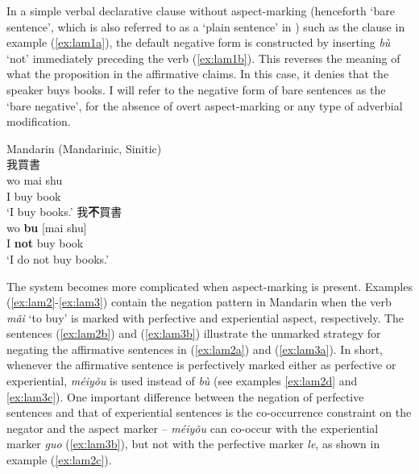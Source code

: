 \documentclass[output=paper]{langscibook}
\begin{document}
In a simple verbal declarative clause without aspect-marking (henceforth `bare sentence', which is also referred to as a `plain sentence' in \citealt{Wang1965}) such as the clause in example (\ref{ex:lam1a}), the default negative form is constructed by inserting \textit{bù} `not' immediately preceding the verb (\ref{ex:lam1b}). This reverses the meaning of what the proposition in the affirmative claims. In this case, it denies that the speaker buys books. I will refer to the negative form of bare sentences as the `bare negative', for the absence of overt aspect-marking or any type of adverbial modification.



\ea Mandarin (Mandarinic, Sinitic) \label{ex:lam1}\\ 
  \ea 我買書 \label{ex:lam1a}\\
    \gll wo mai	shu \\
         I	buy	book\\
    \glt `I buy books.'
  \ex 我\textbf{不}買書 \label{ex:lam1b}\\
    \gll wo \textbf{bu} [mai shu]\\
    	I \textbf{not} buy book\\
    \glt `I do not buy books.'
\z \z

The system becomes more complicated when aspect-marking is present. Examples (\ref{ex:lam2}-\ref{ex:lam3}) contain the negation pattern in Mandarin when the verb \textit{mǎi} `to buy' is marked with perfective and experiential aspect, respectively. The sentences (\ref{ex:lam2b}) and (\ref{ex:lam3b}) illustrate the unmarked strategy for negating the affirmative sentences in (\ref{ex:lam2a}) and (\ref{ex:lam3a}). In short, whenever the affirmative sentence is perfectively marked either as perfective or experiential, \textit{méiyǒu} is used instead of \textit{bù} (see examples \ref{ex:lam2d} and \ref{ex:lam3c}). One important difference between the negation of perfective sentences and that of experiential sentences is the co-occurrence constraint on the negator and the aspect marker – \textit{méiyǒu} can co-occur with the experiential marker \textit{guo} (\ref{ex:lam3b}), but not with the perfective marker \textit{le}, as shown in example (\ref{ex:lam2c}). 
\end{document}
